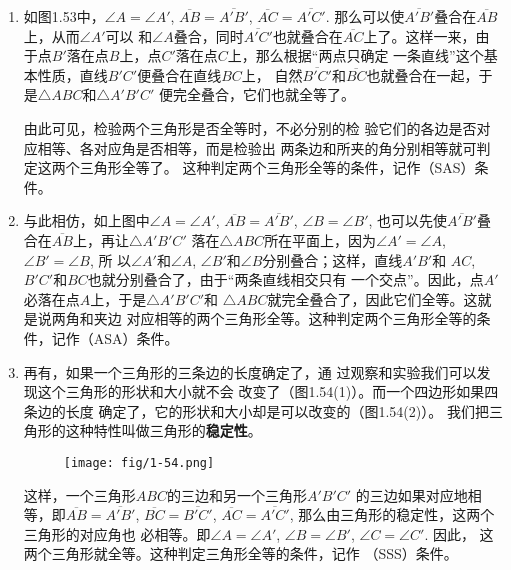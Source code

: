 \begin{enumerate}
	\item 如图1.53中，$\angle A=\angle A'$, $\overline{AB}=\overline{A'B'}$, 
$\overline{AC}=\overline{A'C'}$. 那么可以使$\overline{A'B'}$叠合在$\overline{AB}$上，从而$\angle A'$可以
和$\angle A$叠合，同时$\overline{A'C'}$也就叠合在$\overline{AC}$上了。这样一来，由
于点$B'$落在点$B$上，点$C'$落在点$C$上，那么根据“两点只确定
一条直线”这个基本性质，直线$B'C'$便叠合在直线$BC$上，
自然$\overline{B'C'}$和$\overline{BC}$也就叠合在一起，于是$\triangle ABC$和$\triangle A'B'C'$
便完全叠合，它们也就全等了。
\begin{figure}[htp]
	\centering
{}
	\caption{}
\end{figure}

由此可见，检验两个三角形是否全等时，不必分别的检
验它们的各边是否对应相等、各对应角是否相等，而是检验出
两条边和所夹的角分别相等就可判定这两个三角形全等了。
这种判定两个三角形全等的条件，记作（SAS）条件。

\item 与此相仿，如上图中$\angle A=\angle A'$, $\overline{AB}=\overline{A'B'}$, 
$\angle B=\angle B'$, 也可以先使$\overline{A'B'}$叠合在$\overline{AB}$上，再让$\triangle A'B'C'$
落在$\triangle ABC$所在平面上，因为$\angle A'=\angle A$, $\angle B'=\angle B$, 所
以$\angle A'$和$\angle A$, $\angle B'$和$\angle B$分别叠合；这样，直线$A'B'$和
$AC$, $B'C'$和$BC$也就分别叠合了，由于“两条直线相交只有
一个交点”。因此，点$A'$必落在点$A$上，于是$\triangle A'B'C'$和
$\triangle ABC$就完全叠合了，因此它们全等。这就是说两角和夹边
对应相等的两个三角形全等。这种判定两个三角形全等的条
件，记作（ASA）条件。

\item 再有，如果一个三角形的三条边的长度确定了，通
过观察和实验我们可以发现这个三角形的形状和大小就不会
改变了（图1.54(1)）。而一个四边形如果四条边的长度
确定了，它的形状和大小却是可以改变的（图1.54(2)）。
我们把三角形的这种特性叫做三角形的\textbf{稳定性}。
\begin{figure}[htp]
	\centering
\texttt{[image: fig/1-54.png]}
	\caption{}
\end{figure}

这样，一个三角形$ABC$的三边和另一个三角形$A'B'C'$
的三边如果对应地相等，即$\overline{AB}=\overline{A'B'}$, $\overline{BC}=\overline{B'C'}$, $\overline{AC}=\overline{A'C'}$, 那么由三角形的稳定性，这两个三角形的对应角也
必相等。即$\angle A=\angle A'$, $\angle B=\angle B'$, $\angle C=\angle C'$. 因此，
这两个三角形就全等。这种判定三角形全等的条件，记作
（SSS）条件。
\end{enumerate}

